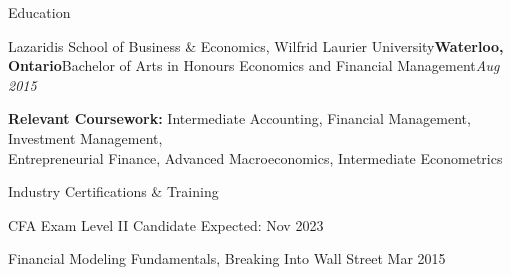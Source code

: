 \documentclass{resume} %
\begin{document}

\begin{rSection}{Education}

\begin{rSubsection}{Lazaridis School of Business \& Economics, Wilfrid Laurier University}{\bf Waterloo, Ontario}{Bachelor of Arts in Honours Economics and Financial Management}{\emph {Aug 2015}}
\smallskip
\item {\bf Relevant Coursework:} Intermediate Accounting, Financial Management, Investment Management, \\Entrepreneurial Finance, Advanced Macroeconomics, Intermediate Econometrics

\end{rSubsection}

\medskip

\begin{iSubsection}{Industry Certifications \& Training}
\item CFA Exam Level II Candidate {\hfill Expected: Nov 2023}
\item Financial Modeling Fundamentals, Breaking Into Wall Street {\hfill Mar 2015} 

\end{iSubsection}

\end{rSection}

\end{document}
